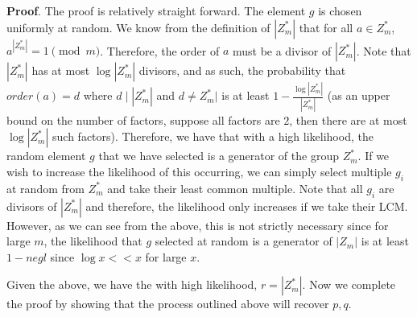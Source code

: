 \documentclass{article}
\begin{document}
\begin{enumerate}[noitemsep,topsep=\mdcompacttopsep]
\begin{mdbmarginx}{1ex}{0pt}{1ex}{0pt}%
\noindent{}\textbf{Proof}.   The proof is relatively straight forward. The element $g$ is chosen uniformly at random. We know from
 the definition of $|Z_m^*|$ that for all $a \in Z_m^*$, $a^{|Z_m^*|} = 1 \pmod m$. Therefore, the
 order of $a$ must be a divisor of $|Z_m^*|$. Note that $|Z_m^*|$ has at most $\log |Z_m^*|$ divisors,
 and as such, the probability that $order(a) = d$ where $d \mid |Z_m^*|$ and $d \neq Z_m^*|$ is at least
 $1 - \frac{\log |Z_m^*| }{|Z_m^*|}$ (as an upper bound on the number of factors, suppose all factors
 are $2$, then there are at most $\log |Z_m^*|$ such factors). Therefore, we have that with a 
 high likelihood, the random element
 $g$ that we have selected is a generator of the group $Z_m^*$. If we wish to increase the likelihood
 of this occurring, we can simply select multiple $g_i$ at random from $Z_m^*$ and take their 
 least common multiple. Note that all $g_i$ are divisors of $|Z_m^*|$ and therefore, the likelihood
 only increases if we take their LCM.  However, as we can see from the above, this is not strictly
 necessary since for large $m$, the likelihood that $g$ selected at random is a generator of $|Z_m|$
 is at least $1 - negl$ since $\log x << x$ for large $x$. 
 \mdfloatright{\ensuremath{\Box}}%
\end{mdbmarginx}%
Given the above, we have the with high likelihood, $r = |Z_m^*|$. Now we complete the proof by showing
that the process outlined above will recover $p,q$. 


\end{enumerate}
\end{document}
